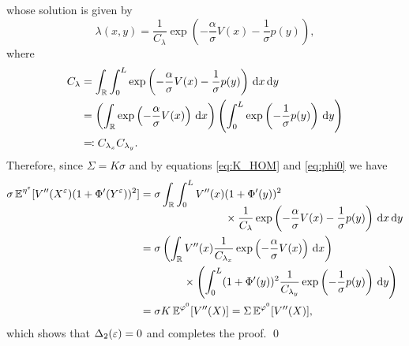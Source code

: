 \documentclass[review,onefignum,onetabnum]{siamonline190516}
\begin{document}
\begin{appendices}
\begin{equation}
	\end{equation}
	whose solution is given by
	\begin{equation}
	\lambda(x,y) = \frac{1}{C_\lambda} \exp \left( - \frac\alpha\sigma V(x) - \frac1\sigma p(y) \right),
	\end{equation}
	where
	\begin{equation}
	\begin{aligned}
	C_{\lambda} &= \int_{\mathbb{R}} \int_0^L \exp \left( - \frac\alpha\sigma V(x) - \frac1\sigma p(y) \right) \,\mathrm{d} x \,\mathrm{d} y \\
	&= \left( \int_{\mathbb{R}} \exp \left( - \frac\alpha\sigma V(x) \right) \,\mathrm{d} x \right) \left( \int_0^L \exp \left( - \frac1\sigma p(y) \right) \,\mathrm{d} y \right) \\
	&\eqqcolon C_{\lambda_x} C_{\lambda_y}.
	\end{aligned}
	\end{equation}
	Therefore, since $\Sigma = K\sigma$ and by equations \eqref{eq:K_HOM} and \eqref{eq:phi0} we have
	\begin{equation}
	\begin{aligned}
	\sigma \operatorname{\mathbb{E}}^{\eta^\varepsilon} [V''(X^\varepsilon) (1 + \Phi'(Y^\varepsilon))^2] &= \sigma \int_{\mathbb{R}} \int_0^L V''(x) 
	\begin{aligned}[t]
	&(1 + \Phi'(y))^2\\
	&\times \frac{1}{C_\lambda} \exp \left( - \frac\alpha\sigma V(x) - \frac1\sigma p(y) \right) \,\mathrm{d} x \,\mathrm{d} y 
	\end{aligned}
	\\
	&= \sigma \left( \int_{\mathbb{R}} V''(x) \frac{1}{C_{\lambda_x}} \exp \left( - \frac\alpha\sigma V(x) \right) \,\mathrm{d} x \right) \\
	&\qquad \qquad \times \left( \int_0^L (1+\Phi'(y))^2 \frac{1}{C_{\lambda_y}} \exp \left( - \frac1\sigma p(y) \right) \,\mathrm{d} y \right) \\
	&= \sigma K \operatorname{\mathbb{E}}^{\varphi^0}[V''(X)] = \Sigma \operatorname{\mathbb{E}}^{\varphi^0}[V''(X)],
	\end{aligned}
	\end{equation}
	which shows that $\Delta_2(\varepsilon) = 0$ and completes the proof. \qed 


\end{appendices}
\end{document}
